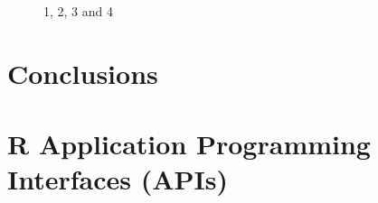 \begin{figure}[H]
	\centering
	\begin{minipage}[b]{0.5\linewidth}
	\end{minipage}\hfill
	\begin{minipage}[b]{0.5\linewidth}
	\end{minipage}\hfill	
	\begin{minipage}[b]{0.5\linewidth}
	\end{minipage}\hfill
	\begin{minipage}[b]{0.5\linewidth}
	\end{minipage}\hfill
	\caption{1, 2, 3 and 4}
	\label{fig:Figure1}
\end{figure} 



\section{Conclusions}


\section{R Application Programming Interfaces (APIs)}




